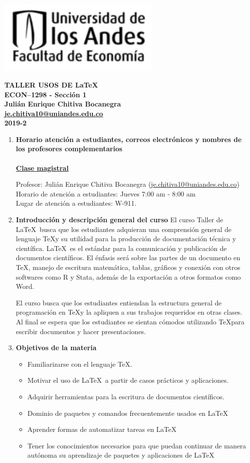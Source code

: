 \documentclass[11pt]{article}
\makeatletter
\newcommand{\encabezado}{\vspace*{-2.5cm}
\begin{minipage}{0.4\linewidth}
\centering
    \includegraphics[width=0.6\textwidth]{img/logo_econ.png}
\end{minipage}
\begin{minipage}{0.6\linewidth}
\begin{center}
\textbf{\large TALLER USOS DE \LaTeX\ }\\
\textbf{\large ECON--1298 - Sección 1}\\
\textbf{\large Julián Enrique Chitiva Bocanegra}\\
\textbf{\href{mailto:je.chitiva10@uniandes.edu.co}{je.chitiva10@uniandes.edu.co}}\\
\textbf{2019-2}\\
\end{center}
\end{minipage}
}
\makeatother
\begin{document}
\vspace*{2cm}
\encabezado


\begin{enumerate}
\item \textbf{Horario atención a estudiantes, correos electrónicos y nombres
  de los profesores complementarios}\\~\\
\textbf{\underline{Clase magistral}}

Profesor: Julián Enrique Chitiva Bocanegra (\href{mailto:je.chitiva10@uniandes.edu.co}{je.chitiva10@uniandes.edu.co}) \\
Horario de atención a estudiantes: Jueves 7:00 am - 8:00 am \\
Lugar de atención a estudiantes: W-911.\\

 \item \textbf{Introducción y descripción general del curso }
 El curso Taller de \LaTeX\ busca que los estudiantes adquieran una comprensión general de lenguaje \TeX y su utilidad para la producción de documentación técnica y científica. \LaTeX\ es el estándar para la comunicación y publicación de documentos científicos. El énfasis será sobre las partes de un documento en \TeX, manejo de escritura matemática, tablas, gráficos y conexión con otros softwares como R y Stata, además de la exportación a otros formatos como Word.

El curso busca que los estudiantes entiendan la estructura general de programación en \TeX y la apliquen a sus trabajos requeridos en otras clases. Al final se espera que los estudiantes se sientan cómodos utilizando \TeX para escribir documentos y hacer presentaciones.


\item\textbf{Objetivos de la materia}

\begin{itemize}
    \item Familiarizarse con el lenguaje \TeX.
    \item Motivar el uso de \LaTeX\ a partir de casos prácticos y aplicaciones.
    \item Adquirir herramientas para la escritura de documentos científicos.
    \item Dominio de paquetes y comandos frecuentemente usados en \LaTeX
    \item Aprender formas de automatizar tareas en \LaTeX
    \item Tener los conocimientos necesarios para que puedan continuar de manera autónoma su
    aprendizaje de paquetes y aplicaciones de \LaTeX
\end{itemize}


\end{enumerate}
\end{document}
